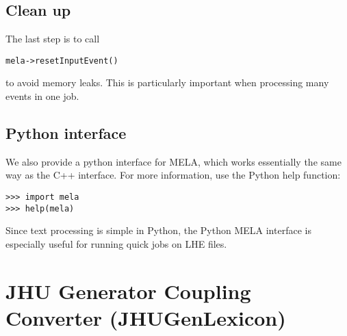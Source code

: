 \documentclass[aps,superscriptaddress,nofootinbib]{revtex4}
\begin{document}
\subsection{Clean up}
The last step is to call
\begin{verbatim}
mela->resetInputEvent()
\end{verbatim}
to avoid memory leaks.  This is particularly important when processing many events in one job.

\subsection{Python interface}
We also provide a python interface for MELA, which works essentially the same way as the C++ interface.  For more information, use the Python help function:
\begin{verbatim}
>>> import mela
>>> help(mela)
\end{verbatim}
Since text processing is simple in Python, the Python MELA interface is especially useful for running quick jobs on LHE files.


\section{JHU Generator Coupling Converter (JHUGenLexicon)}
\end{document}
